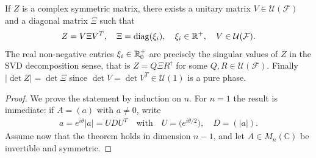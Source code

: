 \documentclass[../QFT_main.tex]{subfiles}
\begin{document}
\begin{mytheorem}
%
If $Z$ is a complex symmetric matrix, there exists a unitary matrix $V\in\mathcal{U}(\mathcal{F})$ and a diagonal matrix $\Xi$ such that 
\begin{align}\label{eq:takagi_identity}
    Z=V\Xi V^T, \quad \Xi = \operatorname{diag}(\xi_i), \quad \xi_i\in\mathbb{R}^+, \quad V\in \mathcal{U}(\mathcal{F}).
\end{align}
The real non-negative entries $\xi_i\in\mathbb{R}^+_0$ are precisely the singular values of $Z$ in the SVD decomposition sense, that is $Z= Q \Xi R^\dagger$ for some $Q,R\in \mathcal{U}(\mathcal{F})$.
Finally $|\det Z| = \det \Xi$ since $\det V=\det V^T\in\mathcal{U}(1)$ is a pure phase.
\end{mytheorem}
\begin{proof}  
We prove the statement by induction on $n$.
For $n=1$ the result is immediate: if $A=(a)$ with $a\neq 0$, write
{\small\begin{align}
    a = e^{i\theta}|a| = U D U^T \quad\text{with}\quad U = \bigl(e^{i\theta/2}\bigr),
    \quad
    D = (|a|).
\end{align}}
Assume now that the theorem holds in dimension $n-1$, and let $A \in M_n(\mathbb{C})$ be invertible and symmetric.


\end{proof}
\end{document}
